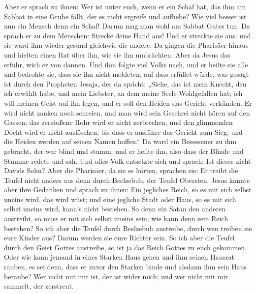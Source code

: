  Aber er sprach zu ihnen: Wer ist unter euch, wenn er ein
Schaf hat, das ihm am Sabbat in eine Grube fällt, der es nicht ergreife
und aufhebe?  Wie viel besser ist nun ein Mensch denn ein
Schaf! Darum mag man wohl am Sabbat Gutes tun.  Da sprach
er zu dem Menschen: Strecke deine Hand aus! Und er streckte sie aus; und
sie ward ihm wieder gesund gleichwie die andere.  Da
gingen die Pharisäer hinaus und hielten einen Rat über ihn, wie sie ihn
umbrächten.  Aber da Jesus das erfuhr, wich er von
dannen. Und ihm folgte viel Volks nach, und er heilte sie alle
 und bedrohte sie, dass sie ihn nicht meldeten,
 auf dass erfüllet würde, was gesagt ist durch den
Propheten Jesaja, der da spricht:  „Siehe, das ist mein
Knecht, den ich erwählt habe, und mein Liebster, an dem meine Seele
Wohlgefallen hat; ich will meinen Geist auf ihn legen, und er soll den
Heiden das Gericht verkünden.  Er wird nicht zanken noch
schreien, und man wird sein Geschrei nicht hören auf den Gassen;
 das zerstoßene Rohr wird er nicht zerbrechen, und den
glimmenden Docht wird er nicht auslöschen, bis dass er ausführe das
Gericht zum Sieg;  und die Heiden werden auf seinen Namen
hoffen.``  Da ward ein Besessener zu ihm gebracht, der
war blind und stumm; und er heilte ihn, also dass der Blinde und Stumme
redete und sah.  Und alles Volk entsetzte sich und
sprach: Ist dieser nicht Davids Sohn?  Aber die
Pharisäer, da sie es hörten, sprachen sie: Er treibt die Teufel nicht
anders aus denn durch Beelzebub, der Teufel Obersten. 
Jesus kannte aber ihre Gedanken und sprach zu ihnen: Ein jegliches
Reich, so es mit sich selbst uneins wird, das wird wüst; und eine
jegliche Stadt oder Haus, so es mit sich selbst uneins wird, kann's
nicht bestehen.  So denn ein Satan den anderen austreibt,
so muss er mit sich selbst uneins sein; wie kann denn sein Reich
bestehen?  So ich aber die Teufel durch Beelzebub
austreibe, durch wen treiben sie eure Kinder aus? Darum werden sie eure
Richter sein.  So ich aber die Teufel durch den Geist
Gottes austreibe, so ist ja das Reich Gottes zu euch gekommen.
 Oder wie kann jemand in eines Starken Haus gehen und ihm
seinen Hausrat rauben, es sei denn, dass er zuvor den Starken binde und
alsdann ihm sein Haus beraube?  Wer nicht mit mir ist,
der ist wider mich; und wer nicht mit mir sammelt, der zerstreut.
